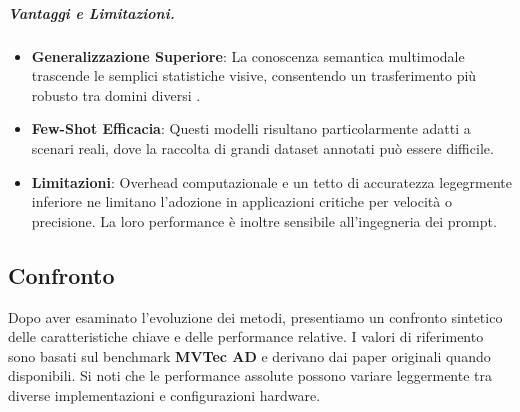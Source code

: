 \subparagraph{Vantaggi e Limitazioni.}

\begin{itemize}
    \item \textbf{Generalizzazione Superiore}: La conoscenza semantica multimodale trascende le semplici statistiche visive, consentendo un trasferimento più robusto tra domini diversi \cite{zhou2024anomalyclip, jeong2023winclip}.
    \item \textbf{Few-Shot Efficacia}: Questi modelli risultano particolarmente adatti a scenari reali, dove la raccolta di grandi dataset annotati può essere difficile.
    \item \textbf{Limitazioni}: Overhead computazionale e un tetto di accuratezza legegrmente inferiore ne limitano l'adozione in applicazioni critiche per velocità o precisione. La loro performance è inoltre sensibile all'ingegneria dei prompt.
\end{itemize}


\subsection{Confronto}

Dopo aver esaminato l'evoluzione dei metodi, presentiamo un confronto sintetico delle caratteristiche chiave e delle performance relative. I valori di riferimento sono basati sul benchmark \textbf{MVTec AD} e derivano dai paper originali quando disponibili. Si noti che le performance assolute possono variare leggermente tra diverse implementazioni e configurazioni hardware. 

